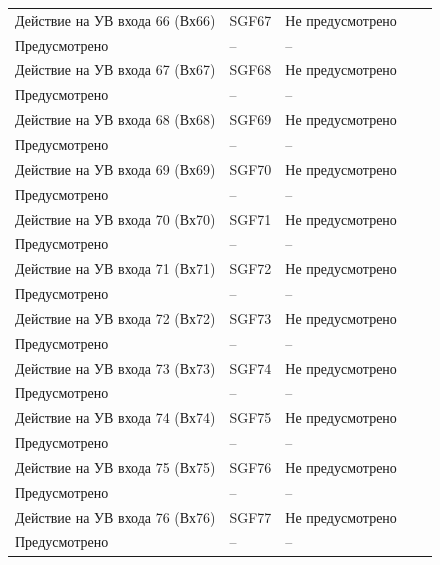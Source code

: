 \begin{longtable}{|>{\centering\arraybackslash}m{5.3cm}|>{\centering\arraybackslash}m{3.3cm}|>{\centering\arraybackslash}m{4.2cm}|>{\centering\arraybackslash}m{1.8cm}|>{\centering\arraybackslash}m{1cm}|}
\hline
\centering Действие на УВ входа 66 (Вх66)  & \centering SGF67 & \centering Не предусмотрено \\ Предусмотрено & \centering -- & \centering \arraybackslash -- \\
\hline
\centering Действие на УВ входа 67 (Вх67)  & \centering SGF68 & \centering Не предусмотрено \\ Предусмотрено & \centering -- & \centering \arraybackslash -- \\
\hline
\centering Действие на УВ входа 68 (Вх68)  & \centering SGF69 & \centering Не предусмотрено \\ Предусмотрено & \centering -- & \centering \arraybackslash -- \\
\hline
\centering Действие на УВ входа 69 (Вх69)  & \centering SGF70 & \centering Не предусмотрено \\ Предусмотрено & \centering -- & \centering \arraybackslash -- \\
\hline
\centering Действие на УВ входа 70 (Вх70)  & \centering SGF71 & \centering Не предусмотрено \\ Предусмотрено & \centering -- & \centering \arraybackslash -- \\
\hline
\centering Действие на УВ входа 71 (Вх71)  & \centering SGF72 & \centering Не предусмотрено \\ Предусмотрено & \centering -- & \centering \arraybackslash -- \\
\hline
\centering Действие на УВ входа 72 (Вх72)  & \centering SGF73 & \centering Не предусмотрено \\ Предусмотрено & \centering -- & \centering \arraybackslash -- \\
\hline
\centering Действие на УВ входа 73 (Вх73)  & \centering SGF74 & \centering Не предусмотрено \\ Предусмотрено & \centering -- & \centering \arraybackslash -- \\
\hline
\centering Действие на УВ входа 74 (Вх74)  & \centering SGF75 & \centering Не предусмотрено \\ Предусмотрено & \centering -- & \centering \arraybackslash -- \\
\hline
\centering Действие на УВ входа 75 (Вх75)  & \centering SGF76 & \centering Не предусмотрено \\ Предусмотрено & \centering -- & \centering \arraybackslash -- \\
\hline
\centering Действие на УВ входа 76 (Вх76)  & \centering SGF77 & \centering Не предусмотрено \\ Предусмотрено & \centering -- & \centering \arraybackslash -- \\

\end{longtable}
